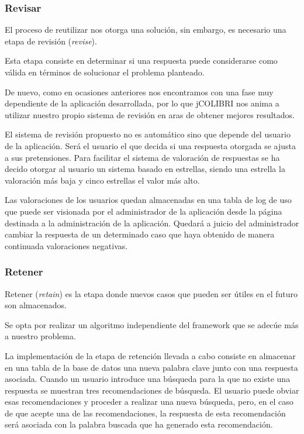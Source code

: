 \subsubsection{Revisar}\label{Revisar}

El proceso de reutilizar nos otorga una solución, sin embargo, es necesario una etapa de revisión (\emph{revise}).

Esta etapa consiste en determinar si una respuesta puede considerarse como válida en términos de solucionar el problema planteado.

De nuevo, como en ocasiones anteriores nos encontramos con una fase muy dependiente de la aplicación desarrollada, por lo que jCOLIBRI nos anima a utilizar nuestro propio sistema de revisión en aras de obtener mejores resultados.

El sistema de revisión propuesto no es automático sino que depende del usuario de la aplicación. Será el usuario el que decida si una respuesta otorgada se ajusta a sus pretensiones. Para facilitar el sistema de valoración de respuestas se ha decido otorgar al usuario un sistema basado en estrellas, siendo una estrella la valoración más baja y cinco estrellas el valor más alto.

Las valoraciones de los usuarios quedan almacenadas en una tabla de log de uso que puede ser visionada por el administrador de la aplicación desde la página destinada a la administración de la aplicación. Quedará a juicio del administrador cambiar la respuesta de un determinado caso que haya obtenido de manera continuada valoraciones negativas.

\subsubsection{Retener}\label{retener}

Retener (\emph{retain}) es la etapa donde nuevos casos que pueden ser útiles en el futuro son almacenados.

Se opta por realizar un algoritmo independiente del framework que se adecúe más a nuestro problema.

La implementación de la etapa de retención llevada a cabo consiste en almacenar en una tabla de la base de datos una nueva palabra clave junto con una respuesta asociada. Cuando un usuario introduce una búsqueda para la que no existe una respuesta se muestran tres recomendaciones de búsqueda. El usuario puede obviar esas recomendaciones y proceder a realizar una nueva búsqueda, pero, en el caso de que acepte una de las recomendaciones, la respuesta de esta recomendación será asociada con la palabra buscada que ha generado esta recomendación.

